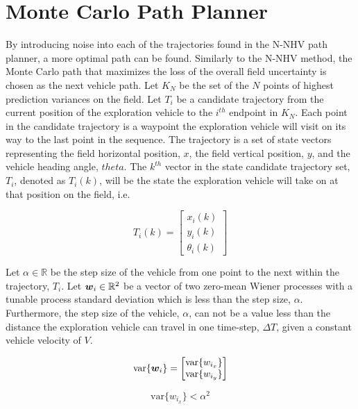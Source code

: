 \section{Monte Carlo Path Planner} \label{sec:mcpp}
By introducing noise into each of the trajectories found in the N-NHV path planner, a more optimal path can be found. Similarly to the N-NHV method, the Monte Carlo path that maximizes the loss of the overall field uncertainty is chosen as the next vehicle path. Let $K_N$ be the set of the $N$ points of highest prediction variances on the field. Let $T_i$ be a candidate trajectory from the current position of the exploration vehicle to the $i^{th}$ endpoint in $K_N$. Each point in the candidate trajectory is a waypoint the exploration vehicle will visit on its way to the last point in the sequence. The trajectory is a set of state vectors representing the field horizontal position, $x$, the field vertical position, $y$, and the vehicle heading angle, $theta$. The $k^{th}$ vector in the state candidate trajectory set, $T_i$, denoted as $T_{i}(k)$, will be the state the exploration vehicle will take on at that position on the field, i.e.

\begin{equation}
T_{i}(k) = \begin{bmatrix} x_i(k) \\ y_i(k) \\ \theta_i(k) \end{bmatrix}
\end{equation}

Let $\alpha \in \mathbb{R}$ be the step size of the vehicle from one point to the next within the trajectory, $T_i$. Let ${\it{\boldsymbol{w}}}_i \in \mathbb{R}^2$ be a vector of two zero-mean Wiener processes with a tunable process standard deviation which is less than the step size, $\alpha$. Furthermore, the step size of the vehicle, $\alpha$, can not be a value less than the distance the exploration vehicle can travel in one time-step, $\Delta T$, given a constant vehicle velocity of $V$.

\begin{equation}
\text{var}\{{\it{\boldsymbol{w}}}_i\} = \begin{bmatrix} \text{var}\{w_{i_x}\} \\ \text{var}\{w_{i_y}\} \end{bmatrix}
\end{equation}

\begin{equation}
\text{var}\{w_{i_x}\} < \alpha^2
\end{equation}

